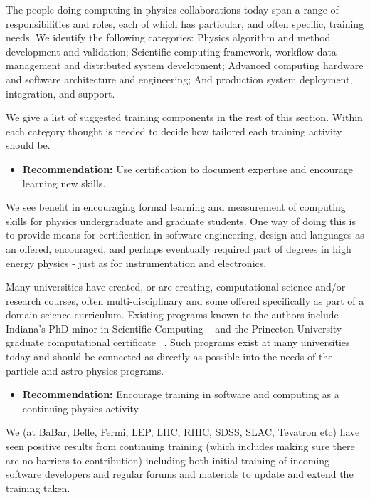 The people doing computing in physics collaborations today span a
range of responsibilities and roles, each of which has particular,
and often specific, training needs.  We identify the following
categories:  Physics algorithm and method development and validation;
Scientific computing framework, workflow data management and
distributed system development; Advanced computing hardware and
software architecture and engineering; And production system
deployment, integration, and support.

We give a list of suggested training components in the rest of this
section.  Within each category thought is needed to decide how
tailored each training activity should be.

\begin{itemize}
\item[] {\bf Recommendation:} Use certification to document expertise and encourage learning new skills.
\end{itemize}

We see benefit in encouraging formal learning and measurement of
computing skills for physics undergraduate and graduate students.
One way of doing this is to provide means for certification in
software engineering, design and languages as an offered, encouraged,
and perhaps eventually required part of degrees in high energy
physics - just as for instrumentation and electronics.
 
Many universities have created, or are creating, computational
science and/or research courses, often multi-disciplinary and some
offered specifically as part of a domain science curriculum.
Existing programs known to the authors  include Indiana's PhD minor 
in Scientific Computing ~\cite{IUGRAD} and the Princeton
University graduate computational certificate ~\cite{PUGRAD}. 
Such programs exist at many universities today and should be connected 
as directly as possible into the needs of the particle and astro 
physics programs.

\begin{itemize}
\item[] {\bf Recommendation:} Encourage training in software and computing as a continuing physics activity
\end{itemize}

We (at BaBar, Belle, Fermi, LEP, LHC, RHIC, SDSS, SLAC, Tevatron
etc) have seen positive results from continuing training (which
includes making sure there are no barriers to contribution) including
both initial training of incoming software developers and regular
forums and materials to update and extend the training taken.

